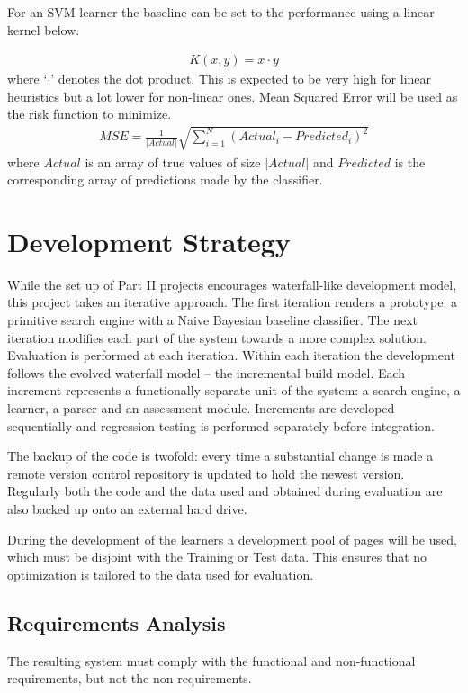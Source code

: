 \documentclass[12pt,notitlepage,twoside]{scrreprt}
\begin{document}
For an SVM learner the baseline can be set to the performance using a linear
kernel below.

\begin{gather*}
K(x,y) = x \cdot y
\end{gather*}
where `\(\cdot\)' denotes the dot product.
This is expected to be very high for linear heuristics but a lot lower for
non-linear ones.
Mean Squared Error will be used as the risk function to minimize.
\begin{gather*}
  MSE = \frac{1}{|Actual|}\sqrt{\sum_{i=1}^{N}(Actual_i - Predicted_i)^2}
\end{gather*}
where \(Actual\) is an array of true values of size \(|Actual|\) and
\(Predicted\) is the corresponding array of predictions made by the classifier.

\section{Development Strategy}
While the set up of Part II projects encourages waterfall-like development
model, this project takes an iterative approach. The first iteration renders a
prototype: a primitive search engine with a Naive Bayesian baseline classifier.
The next iteration modifies each part of the system towards a more complex
solution. Evaluation is performed at each iteration. Within each  iteration the
development follows the evolved waterfall model -- the incremental build model.
Each increment represents a functionally separate unit of the system: a search
engine, a learner, a parser and an assessment module. Increments are developed
sequentially and regression testing is performed separately before
integration.

The backup of the code is twofold: every time a substantial change is made a remote
version control repository is updated to hold the newest version. Regularly both the code and
the data used and obtained during evaluation are also backed up onto an
external hard drive.

During the development of the learners a development pool of pages will
be used, which must be disjoint with the Training or Test data. This ensures
that no optimization is tailored to the data used for evaluation. 

\subsection*{Requirements Analysis}
The resulting system must comply with the functional and non-functional requirements, but
not the non-requirements.
\end{document}
